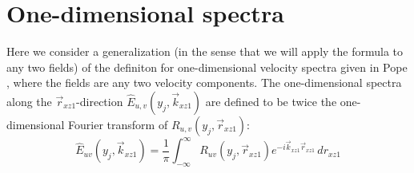 \documentclass[letterpaper,11pt,nointlimits,reqno]{amsart}
\begin{document}
\section{One-dimensional spectra
         \citep[\textsection{}6.5]{Pope2000Turbulent}}

Here we consider a generalization (in the sense that we will apply the formula
to any two fields) of the definiton for one-dimensional velocity spectra given
in Pope \citep[\textsection{}6.3]{Pope2000Turbulent}, where the fields are any
two velocity components.  The one-dimensional spectra along the
$\vec{r}_{xz1}$-direction  $\hat{E}_{u,v}(y_j,\vec{k}_{xz1})$ are defined to be twice
the one-dimensional Fourier transform of $R_{u,v}(y_j,\vec{r}_{xz1})$:
%
\begin{equation}
\hat{E}_{uv}(y_j,\vec{k}_{xz1}) = \frac{1}{\pi} \int_{-\infty}^{\infty}
                           R_{uv}(y_j,\vec{r}_{xz1})
                           e^{-i \vec{k}_{xz1} \vec{r}_{xz1}} \,d\!r_{xz1}
\end{equation}
%

\newcommand*{\doi}[1]{\href{http://dx.doi.org/\detokenize{#1}}{doi: #1}}


\end{document}
